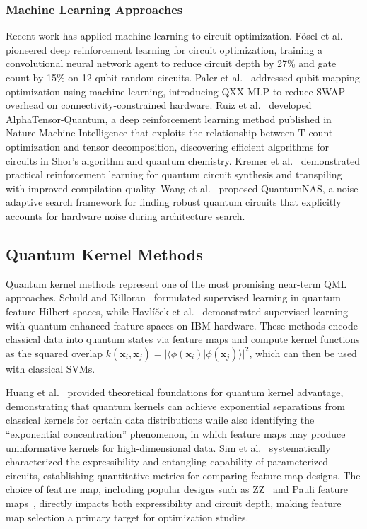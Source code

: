 \documentclass{ieeeaccess}
\begin{document}
\subsubsection{Machine Learning Approaches}
Recent work has applied machine learning to circuit optimization. F{\"o}sel et al.~\cite{Fosel2021} pioneered deep reinforcement learning for circuit optimization, training a convolutional neural network agent to reduce circuit depth by 27\% and gate count by 15\% on 12-qubit random circuits. Paler et al.~\cite{Paler2023} addressed qubit mapping optimization using machine learning, introducing QXX-MLP to reduce SWAP overhead on connectivity-constrained hardware. Ruiz et al.~\cite{Ruiz2025} developed AlphaTensor-Quantum, a deep reinforcement learning method published in Nature Machine Intelligence that exploits the relationship between T-count optimization and tensor decomposition, discovering efficient algorithms for circuits in Shor's algorithm and quantum chemistry. Kremer et al.~\cite{Kremer2024} demonstrated practical reinforcement learning for quantum circuit synthesis and transpiling with improved compilation quality. Wang et al.~\cite{Wang2022QuantumNAS} proposed QuantumNAS, a noise-adaptive search framework for finding robust quantum circuits that explicitly accounts for hardware noise during architecture search.

\subsection{Quantum Kernel Methods}
\label{sec:rw_kernels}

Quantum kernel methods represent one of the most promising near-term QML approaches. Schuld and Killoran~\cite{Schuld2019} formulated supervised learning in quantum feature Hilbert spaces, while Havl\'{i}\v{c}ek et al.~\cite{Havlicek2019} demonstrated supervised learning with quantum-enhanced feature spaces on IBM hardware. These methods encode classical data into quantum states via feature maps and compute kernel functions as the squared overlap $k(\mathbf{x}_i, \mathbf{x}_j) = |\langle\phi(\mathbf{x}_i)|\phi(\mathbf{x}_j)\rangle|^2$, which can then be used with classical SVMs.

Huang et al.~\cite{Huang2021} provided theoretical foundations for quantum kernel advantage, demonstrating that quantum kernels can achieve exponential separations from classical kernels for certain data distributions while also identifying the ``exponential concentration'' phenomenon, in which feature maps may produce uninformative kernels for high-dimensional data. Sim et al.~\cite{Sim2019} systematically characterized the expressibility and entangling capability of parameterized circuits, establishing quantitative metrics for comparing feature map designs. The choice of feature map, including popular designs such as ZZ~\cite{Havlicek2019} and Pauli feature maps~\cite{Schuld2019}, directly impacts both expressibility and circuit depth, making feature map selection a primary target for optimization studies.
\end{document}
